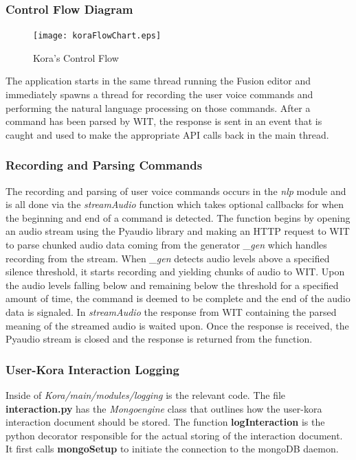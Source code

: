 \documentclass[onecolumn, draftclsnofoot,10pt, compsoc]{IEEEtran}
\begin{document}
\subsubsection{Control Flow Diagram}
	\begin{figure}[H]
		\texttt{[image: koraFlowChart.eps]}
		\centering
		\caption{Kora's Control Flow}
	\end{figure}
The application starts in the same thread running the Fusion editor and immediately spawns a thread for recording the user voice commands and performing the natural language processing on those commands.
After a command has been parsed by WIT, the response is sent in an event that is caught and used to make the appropriate API calls back in the main thread.

\subsubsection{Recording and Parsing Commands}
The recording and parsing of user voice commands occurs in the \textit{nlp} module and is all done via the \textit{streamAudio} function which takes optional callbacks for when the beginning and end of a command is detected.
The function begins by opening an audio stream using the Pyaudio library and making an HTTP request to WIT to parse chunked audio data coming from the generator \textit{\_gen} which handles recording from the stream.
When \textit{\_gen} detects audio levels above a specified silence threshold, it starts recording and yielding chunks of audio to WIT.
Upon the audio levels falling below and remaining below the threshold for a specified amount of time, the command is deemed to be complete and the end of the audio data is signaled.
In \textit{streamAudio} the response from WIT containing the parsed meaning of the streamed audio is waited upon.
Once the response is received, the Pyaudio stream is closed and the response is returned from the function.

\subsubsection{User-Kora Interaction Logging }
Inside of \textit{Kora/main/modules/logging} is the relevant code.
The file \textbf{interaction.py} has the \textit{Mongoengine} class that outlines how the user-kora interaction document should be stored. The function \textbf{logInteraction} is the python decorator responsible for the actual storing of the interaction document. It first calls \textbf{mongoSetup} to initiate the connection to the mongoDB daemon.
\end{document}
